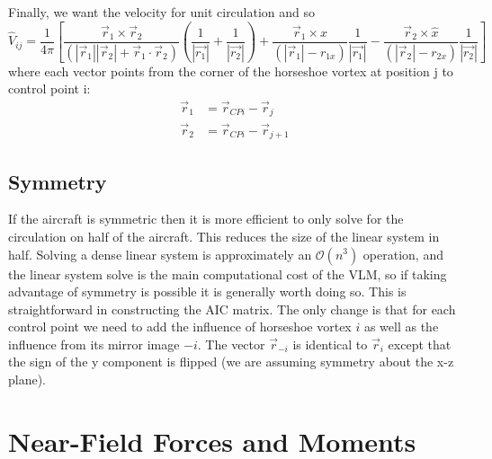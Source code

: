 \documentclass{article}
\begin{document}
Finally, we want the velocity for unit circulation and so 
\begin{equation}
\hat{V}_{ij} = 
\frac{1}{4 \pi} 
\left[
\frac{\vec{r}_{1} \times \vec{r}_{2}}{(|\vec{r}_{1}||\vec{r}_{2}| + \vec{r}_{1} \cdot \vec{r}_{2})} \left(\frac{1}{|\vec{r_{1}}|} + \frac{1}{|\vec{r_{2}}|} \right)
+
\frac{\vec{r}_{1} \times \hat{x}}{(|\vec{r}_{1}| - r_{1x})} \frac{1}{|\vec{r_{1}}|} 
-
\frac{\vec{r}_{2} \times \hat{x}}{(|\vec{r}_{2}| - r_{2x} )} \frac{1}{|\vec{r_{2}}|} 
\right]
\label{eq:vhorseshoe}
\end{equation}
where each vector points from the corner of the horseshoe vortex at position j to control point i:
\begin{align}
\vec{r}_1 &= \vec{r}_{CPi} - \vec{r}_{j}\\
\vec{r}_2 &= \vec{r}_{CPi} - \vec{r}_{j+1}
\end{align}

\subsection{Symmetry}

If the aircraft is symmetric then it is more efficient to only solve for the circulation on half of the aircraft.  This reduces the size of the linear system in half.  Solving a dense linear system is approximately an $\mathcal{O}(n^3)$ operation, and the linear system solve is the main computational cost of the VLM, so if taking advantage of symmetry is possible it is generally worth doing so.  This is straightforward in constructing the AIC matrix.  The only change is that for each control point we need to add the influence of horseshoe vortex $i$ as well as the influence from its mirror image $-i$.  The vector $\vec{r}_{-i}$ is identical to $\vec{r}_{i}$ except that the sign of the y component is flipped (we are assuming symmetry about the x-z plane).

\section{Near-Field Forces and Moments}
\end{document}
